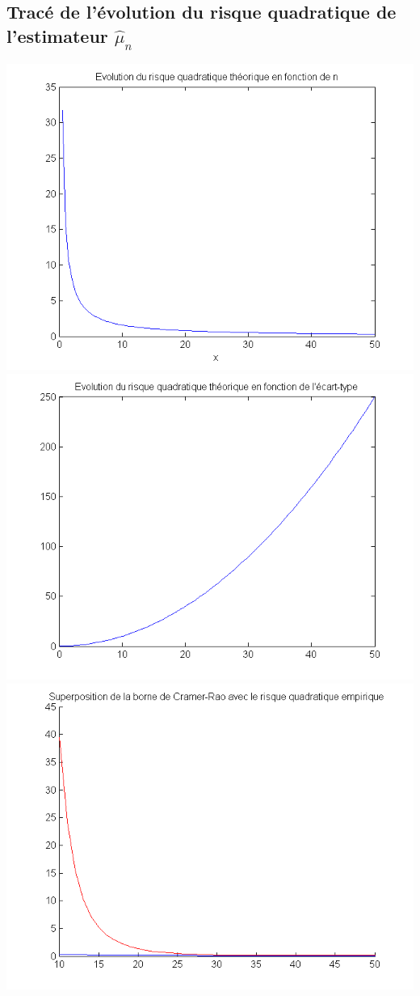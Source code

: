 \documentclass{report}
\begin{document}
		\subsection{Tracé de l'évolution du risque quadratique de l'estimateur $\hat\mu_n$}
		\begin{center}
			\includegraphics[scale=0.7]{sources/Q314-1.png}
			\includegraphics[scale=0.7]{sources/Q314-2.png}
			\includegraphics[scale=0.7]{sources/Q314-3.png}
		\end{center}
\end{document}
